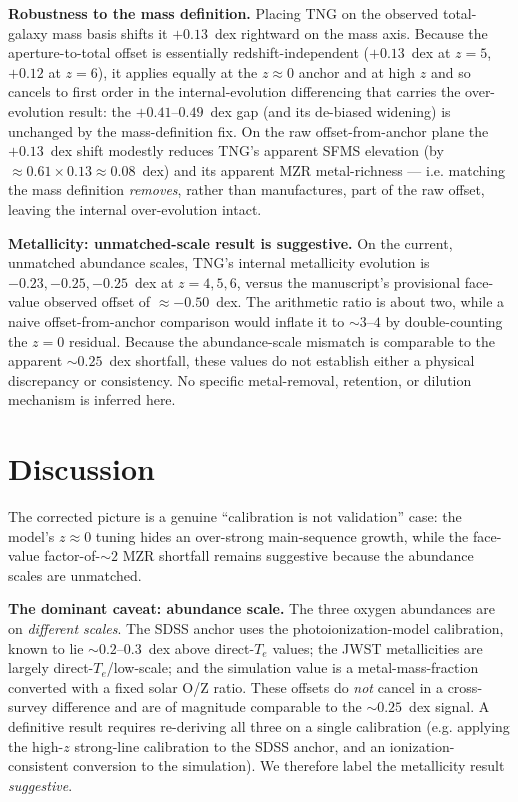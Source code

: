 \documentclass[twocolumn]{aastex631}
\begin{document}
\textbf{Robustness to the mass definition.} Placing TNG on the observed total-galaxy mass basis shifts it $+0.13$~dex rightward on the mass axis. Because the aperture-to-total offset is essentially redshift-independent ($+0.13$~dex at $z=5$, $+0.12$ at $z=6$), it applies equally at the $z\approx0$ anchor and at high $z$ and so cancels to first order in the internal-evolution differencing that carries the over-evolution result: the $+0.41$--$0.49$~dex gap (and its de-biased widening) is unchanged by the mass-definition fix. On the raw offset-from-anchor plane the $+0.13$~dex shift modestly reduces TNG's apparent SFMS elevation (by $\approx0.61\times0.13\approx0.08$~dex) and its apparent MZR metal-richness --- i.e. matching the mass definition \emph{removes}, rather than manufactures, part of the raw offset, leaving the internal over-evolution intact.

\textbf{Metallicity: unmatched-scale result is suggestive.} On the current, unmatched abundance scales, TNG's internal metallicity evolution is $-0.23,-0.25,-0.25$~dex at $z=4,5,6$, versus the manuscript's provisional face-value observed offset of $\approx-0.50$~dex. The arithmetic ratio is about two, while a naive offset-from-anchor comparison would inflate it to $\sim3$--$4$ by double-counting the $z=0$ residual. Because the abundance-scale mismatch is comparable to the apparent $\sim0.25$~dex shortfall, these values do not establish either a physical discrepancy or consistency. No specific metal-removal, retention, or dilution mechanism is inferred here.

\section{Discussion}
The corrected picture is a genuine ``calibration is not validation'' case: the model's $z\approx0$ tuning hides an over-strong main-sequence growth, while the face-value factor-of-$\sim2$ MZR shortfall remains suggestive because the abundance scales are unmatched.

\textbf{The dominant caveat: abundance scale.} The three oxygen abundances are on \emph{different scales}. The SDSS anchor uses the \citet{tremonti04} photoionization-model calibration, known to lie $\sim0.2$--$0.3$~dex above direct-$T_e$ values; the JWST metallicities are largely direct-$T_e$/low-scale; and the simulation value is a metal-mass-fraction converted with a fixed solar O/Z ratio. These offsets do \emph{not} cancel in a cross-survey difference and are of magnitude comparable to the $\sim0.25$~dex signal. A definitive result requires re-deriving all three on a single calibration (e.g. applying the high-$z$ strong-line calibration to the SDSS anchor, and an ionization-consistent conversion to the simulation). We therefore label the metallicity result \emph{suggestive}.
\end{document}
